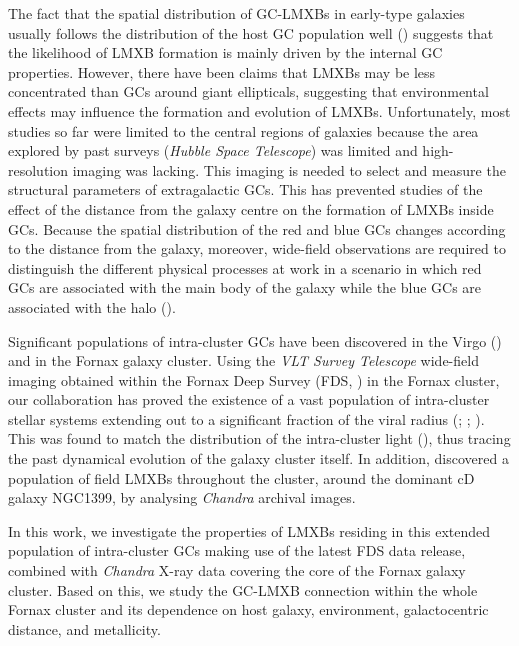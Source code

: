 \documentclass{aa}
\begin{document}
The fact that the spatial distribution of GC-LMXBs in early-type galaxies usually follows the distribution of the host GC population well (\citealt{Paolillo2011}) suggests that the likelihood of LMXB formation is mainly driven by the internal GC properties. However, there have been claims that LMXBs may be less concentrated than GCs around giant ellipticals, suggesting that environmental effects may influence the formation and evolution of LMXBs. Unfortunately, most studies so far were limited to the central regions of galaxies because the area explored by past surveys (\textit{Hubble Space Telescope}) was limited and high-resolution imaging was lacking. This imaging is needed to select and measure the structural parameters of extragalactic GCs. This has prevented studies of the effect of the distance from the galaxy centre on the formation of LMXBs inside GCs. Because the spatial distribution of the red and blue GCs changes according to the distance from the galaxy, moreover, wide-field observations are required to distinguish the different physical
processes at work in a scenario in which red GCs are associated with the main body of the galaxy while the blue GCs are associated with the halo (\citealt{Cantiello2018}).

Significant populations of intra-cluster GCs have been discovered in the Virgo (\citealt{Durrell2014}) and in the Fornax galaxy cluster. Using the \textit{VLT Survey Telescope} wide-field imaging obtained within the Fornax Deep Survey (FDS, \citealt{Iodice2016}) in the Fornax cluster, our collaboration has proved the existence of a vast population of intra-cluster stellar systems extending out to a significant fraction of the viral radius (\citealt{D'Abrusco2016}; \citealt{Cantiello2018}; \citealt{Cantiello2020}). This was found to match the distribution of the intra-cluster light (\citealt{Iodice2017}), thus tracing the past dynamical evolution of the galaxy cluster itself. In addition, \cite{Jin2019} discovered a population of field LMXBs throughout the cluster, around the dominant cD galaxy NGC1399, by analysing \textit{Chandra} archival images.

In this work, we investigate the properties of LMXBs residing in this extended population of intra-cluster GCs making use of the latest FDS data release, combined with \textit{Chandra} X-ray data covering the core of the Fornax galaxy cluster. Based on this, we study the GC-LMXB connection within the whole Fornax cluster and its dependence on host galaxy, environment, galactocentric distance, and metallicity.
\end{document}
